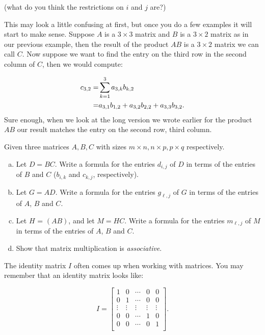 (what do you think the restrictions on $i$ and $j$ are?)

This may look a little confusing at first, but once you do a few examples it will start to make sense.  Suppose ${A}$ is a $3 \times 3$ matrix and ${B}$ is a $3 \times 2$ matrix as in our previous example, then the result of the product ${A} {B}$ is a $3 \times 2 $ matrix we can call ${C}$.  Now suppose we want to find the entry on the third row in the second column of ${C}$, then we would compute:

\begin{align}
{c}_{3,2} =& \sum_{k=1}^3 a_{3,k} b_{k,2} \notag\\
=& a_{3,1} b_{1,2} + a_{3,2} b_{2,2} + a_{3,3} b_{3,2}.  \notag
\end{align}
Sure enough, when we look at the long version we wrote earlier for the product ${AB}$ our result matches the entry on the second row, third column.

\begin{exercise}
Given three matrices $A, B, C$ with sizes $m \times n, n \times p, p \times q$ respectively.
\begin{enumerate}[(a)]
\item
Let $D = BC$.  Write a formula for the entries $d_{i,j}$ of $D$ in terms of the entries of $B$ and $C$ ($b_{i,k}$ and $c_{k,j}$, respectively). 
\item
Let $G = AD$.  Write a formula for the entries $g_{\ell,j}$ of $G$ in terms of the entries of $A$, $B$ and $C$.
\item
Let $H$ =  $(AB)$, and let $M = HC$. Write a formula for the entries $m_{\ell,j}$ of $M$ in terms of the entries of $A$, $B$ and $C$.
\item
Show that matrix multiplication is \emph{associative}.
\end{enumerate}
\end{exercise}

The {\bfi identity matrix} $I$ often comes up when working with matrices. You may remember that an identity matrix looks like:

\[I = \left[ \begin{array}{ccccc}
1 & 0  & \cdots & 0 & 0 \\
0 & 1  & \cdots & 0 & 0  \\
\vdots & \vdots & \vdots & \vdots & \vdots\\
0 & 0  & \cdots & 1 & 0  \\
0 & 0  & \cdots & 0 & 1  \\
 \end{array} \right]. \]

